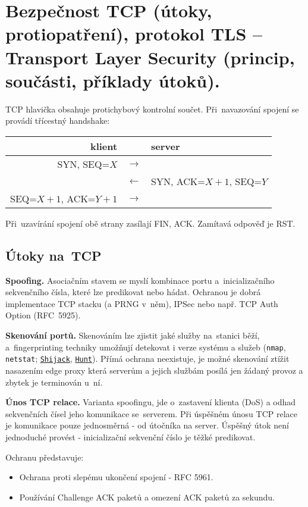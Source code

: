 \section{Bezpečnost TCP (útoky, protiopatření), protokol TLS -- Transport Layer Security (princip, součásti, příklady útoků).}

TCP hlavička obsahuje protichybový kontrolní součet.
Při~navazování spojení se provádí třícestný handshake:
\begin{center}
\begin{tabular}{rcl}
	klient & & server \\
	\hline
	SYN, SEQ=$X$ & $\rightarrow$ & \\
	& $\leftarrow$ & SYN, ACK=$X+1$, SEQ=$Y$ \\
	SEQ=$X+1$, ACK=$Y+1$ & $\rightarrow$ \\
\end{tabular}
\end{center}
Při~uzavírání spojení obě strany zasílají FIN, ACK.
Zamítavá odpověď je RST.


\subsection{Útoky na~TCP}

\textbf{Spoofing.}
Asociačním stavem se myslí kombinace portu a~inicializačního sekvenčního čísla, které lze predikovat nebo hádat.
Ochranou je dobrá implementace TCP stacku (a PRNG v~něm), IPSec nebo např. TCP Auth Option (RFC~5925).

\textbf{Skenování portů.}
Skenováním lze zjistit jaké služby na~stanici běží, a~fingerprinting techniky umožňují detekovat i verze systému a služeb (\texttt{nmap}, \texttt{netstat}; \href{https://github.com/hackman/shijack}{\texttt{Shijack}}, \href{https://linux.die.net/man/1/hunt}{\texttt{Hunt}}).
Přímá ochrana neexistuje, je možné skenování ztížit nasazením edge proxy která serverům a jejich službám posílá jen žádaný provoz a zbytek je terminován u~ní.

\textbf{Únos TCP relace.}
Varianta spoofingu, jde o~zastavení klienta (DoS) a odhad sekvenčních čísel jeho komunikace se~serverem. Při úspěšném únosu TCP relace je komunikace pouze jednosměrná - od útočníka na server. Úspěšný útok není jednoduché provést - inicializační sekvenční číslo je těžké predikovat. 

Ochranu představuje:
\begin{itemize}
    \item Ochrana proti slepému ukončení spojení - RFC 5961.
    \item Používání Challenge ACK paketů a omezení ACK paketů
za sekundu.
\end{itemize}

